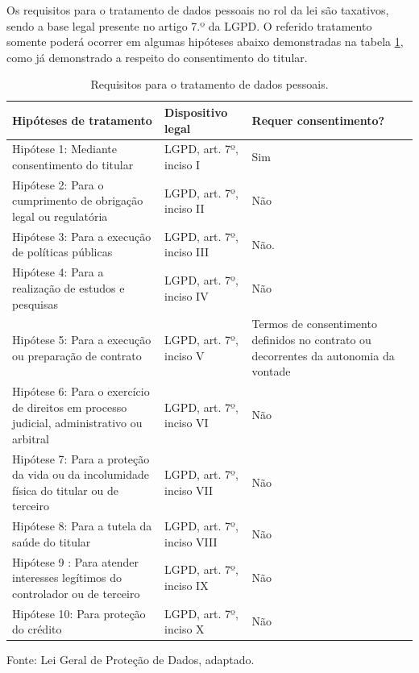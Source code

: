 \documentclass[
	12pt,				%
	openright,			%
	oneside,			%
	a4paper,			%
	english,			%
	french,				%
	spanish,			%
	brazil,				%
	]{abntex2}
\begin{document}
Os requisitos para o tratamento de dados pessoais no rol da lei são taxativos, sendo a base legal presente no artigo 7.º da LGPD. O referido tratamento somente poderá ocorrer em algumas hipóteses abaixo demonstradas na tabela \ref{tab: requisitos de tratamento de dados}, como já demonstrado a respeito do consentimento do titular.
\begin{table}[ht]
    \centering
    \caption{Requisitos para o tratamento de dados pessoais.}
    \label{tab: requisitos de tratamento de dados}
    \begin{tabular}{|p{5.5 cm}|p{4.5cm}|p{5.5cm}|} 
        \hline
        \textbf{Hipóteses de tratamento} & \textbf{Dispositivo legal} & \textbf{Requer consentimento?} \\ \hline
        
         Hipótese 1: Mediante consentimento do titular & LGPD, art. 7º, inciso I & Sim \\ \hline
         
        Hipótese 2: Para o cumprimento de obrigação legal ou regulatória & LGPD, art. 7º, inciso II & Não  \\ \hline
        
        Hipótese 3: Para a execução de políticas públicas
 & LGPD, art. 7º, inciso III & Não. \\ \hline
 
        Hipótese 4: Para a realização de estudos e pesquisas & LGPD, art. 7º, inciso IV & Não  \\ \hline
        
        Hipótese 5: Para a execução ou preparação de contrato & LGPD, art. 7º, inciso V & Termos de consentimento definidos no contrato ou decorrentes da autonomia da vontade  \\ \hline
        
        Hipótese 6: Para o exercício de direitos em processo judicial, administrativo ou arbitral & LGPD, art. 7º, inciso VI & Não  \\ \hline
        
        Hipótese 7: Para a proteção da vida ou da incolumidade física do titular ou de terceiro & LGPD, art. 7º, inciso VII & Não  \\ \hline
        
        Hipótese 8: Para a tutela da saúde do titular & LGPD, art. 7º, inciso VIII & Não  \\ \hline
        
        Hipótese 9 : Para atender interesses legítimos do controlador ou de terceiro & LGPD, art. 7º, inciso IX & Não  \\ \hline
        
        Hipótese 10: Para proteção do crédito & LGPD, art. 7º, inciso X & Não  \\ \hline
    \end{tabular}
    \newline \newline Fonte: Lei Geral de Proteção de Dados, \cite{ 01-01-LeiGeral} adaptado.
\end{table}
\end{document}
